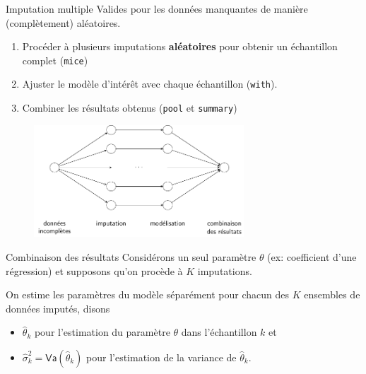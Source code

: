 \documentclass[
  ignorenonframetext,
]{beamer}
\providecommand{\tightlist}{%
  \setlength{\itemsep}{0pt}\setlength{\parskip}{0pt}}\usepackage{longtable,booktabs,array}
\begin{document}
\begin{frame}[fragile]{Imputation multiple}
\protect\hypertarget{imputation-multiple}{}
Valides pour les données manquantes de manière (complètement)
aléatoires.

\begin{enumerate}
\tightlist
\item
  Procéder à plusieurs imputations \textbf{aléatoires} pour obtenir un
  échantillon complet (\texttt{mice})
\item
  Ajuster le modèle d'intérêt avec chaque échantillon (\texttt{with}).
\item
  Combiner les résultats obtenus (\texttt{pool} et \texttt{summary})
\end{enumerate}

\begin{figure}

{\centering \includegraphics[width=0.7\textwidth,height=\textheight]{figures/donnees_manquantes_workflow.pdf}

}

\end{figure}
\end{frame}

\begin{frame}{Combinaison des résultats}
\protect\hypertarget{combinaison-des-ruxe9sultats}{}
Considérons un seul paramètre \(\theta\) (ex: coefficient d'une
régression) et supposons qu'on procède à \(K\) imputations.

On estime les paramètres du modèle séparément pour chacun des \(K\)
ensembles de données imputés, disons

\begin{itemize}
\tightlist
\item
  \(\widehat{\theta}_k\) pour l'estimation du paramètre \(\theta\) dans
  l'échantillon \(k\) et
\item
  \(\widehat{\sigma}_k^2=\mathsf{Va}(\widehat{\theta}_k)\) pour
  l'estimation de la variance de \(\widehat{\theta}_k\).
\end{itemize}
\end{frame}
\end{document}
